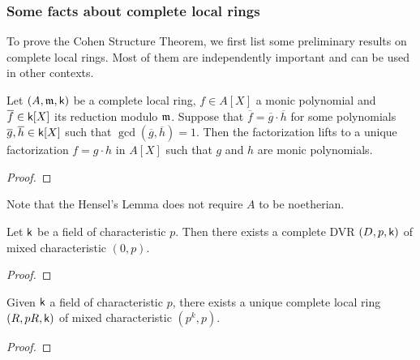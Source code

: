     \subsubsection{Some facts about complete local rings}

        To prove the Cohen Structure Theorem, we first list some preliminary results on complete local rings.
        Most of them are independently important and can be used in other contexts.

        \begin{theorem}\label{thm: Hensel Lemma}
            Let \((A,{\mathfrak{m}}, {\mathsf{k}})\) be a complete local ring, \(f \in A[X]\) a monic polynomial and \(\overline{f} \in {\mathsf{k}}[X]\) its reduction modulo \({\mathfrak{m}}\).
            Suppose that \(\overline{f} = \overline{g} \cdot \overline{h}\) for some polynomials \(\overline{g}, \overline{h} \in {\mathsf{k}}[X]\) such that \(\gcd (\overline{g},\overline{h}) = 1\).
            Then the factorization lifts to a unique factorization \(f = g \cdot h\) in \(A[X]\) such that \(g\) and \(h\) are monic polynomials.
        \end{theorem}
        \begin{proof}
        \end{proof}

        \begin{remark}\label{rmk: Hensel's Lemma does not require A to be noetherian}
            Note that the Hensel's Lemma does not require \(A\) to be noetherian.
        \end{remark}

        \begin{lemma}\label{lem: DVR with certain residue field}
            Let \({\mathsf{k}}\) be a field of characteristic \(p\).
            Then there exists a complete DVR \((D,p,{\mathsf{k}})\) of mixed characteristic \((0,p)\).
        \end{lemma}
        \begin{proof}
        \end{proof}

        \begin{lemma}\label{lem: unique complete local ring of mixed characteristic (p^k,p)}
            Given \({\mathsf{k}}\) a field of characteristic \(p\), 
            there exists a unique complete local ring \((R,pR,{\mathsf{k}})\) of mixed characteristic \((p^k,p)\).
        \end{lemma}
        \begin{proof}
        \end{proof}


